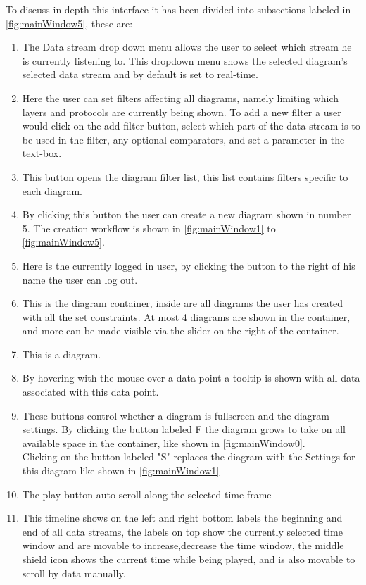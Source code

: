 \documentclass[twoside, english, draft]{Pflichtenheft}
\begin{document}
To discuss in depth this interface it has been divided into subsections labeled in \autoref{fig:mainWindow5}, these are:
\\
\begin{enumerate}
	\item The Data stream drop down menu allows the user to select which stream he is currently listening to. This dropdown menu shows the selected diagram's selected data stream and by default is set to real-time.
	\item Here the user can set filters affecting all diagrams, namely limiting which layers and protocols are currently being shown. To add a new filter a user would click on the add filter button, select which part of the data stream is to be used in the filter, any optional comparators, and set a parameter in the text-box.
	\item This button opens the diagram filter list, this list contains filters specific to each diagram.
	\item By clicking this button the user can create a new diagram shown in number 5. The creation workflow is shown in \autoref{fig:mainWindow1} to \autoref{fig:mainWindow5}.
	\item Here is the currently logged in user, by clicking the button to the right of his name the user can log out.
	\item This is the \gls{diagram container}, inside are all diagrams the user has created with all the set constraints. At most 4 diagrams are shown in the container, and more can be made visible via the slider on the right of the container.
	\item This is a diagram.
	\item By hovering with the mouse over a data point a tooltip is shown with all data associated with this data point.
	\item These buttons control whether a diagram is fullscreen and the diagram settings. By clicking the button labeled F the diagram grows to take on all available space in the container, like shown in \autoref{fig:mainWindow0}.
	      \\
	      Clicking on the button labeled "S" replaces the diagram with the Settings for this diagram like shown in \autoref{fig:mainWindow1}
	\item The play button auto scroll along the selected time frame
	\item This timeline shows on the left and right bottom labels the beginning and end of all data streams, the labels on top show the currently selected time window and are movable to increase,decrease the time window, the middle shield icon shows the current time while being played, and is also movable to scroll by data manually.

\end{enumerate}
\end{document}
